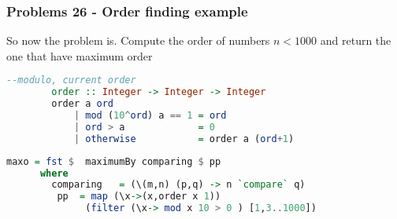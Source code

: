	
		\begin{frame}[fragile]\frametitle{Problems 26 - Order finding example}
		
		\begin{exampleblock}{So now the problem is. Compute the order of numbers
		$n<1000$ and return the one that have maximum order}
		 \begin{lstlisting}[language=Haskell,basicstyle=\footnotesize\ttfamily]
		--modulo, current order
		order :: Integer -> Integer -> Integer
		order a ord 
			| mod (10^ord) a == 1 = ord
			| ord > a 			  = 0
			| otherwise 		  = order a (ord+1)
		\end{lstlisting} 
	\end{exampleblock}
	
	\begin{lstlisting}[language=Haskell,basicstyle=\footnotesize\ttfamily]	
	maxo = fst $  maximumBy comparing $ pp
	  where
	    comparing 	= (\(m,n) (p,q) -> n `compare` q)
	     pp  = map (\x->(x,order x 1)) 
	          (filter (\x-> mod x 10 > 0 ) [1,3..1000])
		 
		 
	\end{lstlisting}
	



	\end{frame}
